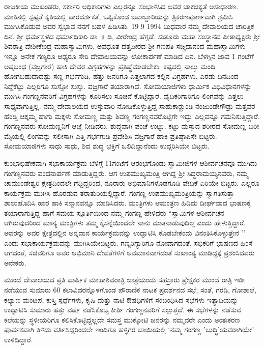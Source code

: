 {ರಾಜಕೀಯ  ಮುಖಂಡರು,  ಸರ್ಕಾರಿ ಅಧಿಕಾರಿಗಳು ಎಲ್ಲರನ್ನೂ ಸಂಭಾಳಿಸಿದ ಅವರ ಚಾಕಚಕ್ಯತೆ ಅಸಾಧಾರಣ. ಮಾತಿನಲ್ಲಿ ಸ್ಪಷ್ಟತೆ ಕೃತಿಯಲ್ಲಿ ಪಾರದರ್ಶಕತೆ, ಒಪ್ಪಿಕೊಂಡ ಜವಾಬ್ದಾರಿಯನ್ನು ತ್ರಿಕರಣಪೂರ್ಣವಾಗಿ ಶ್ರಮಿಸಿ ಮುಗಿಸಿಕೊಡುವ ಅವರ ಸ್ವಭಾವ ನನಗೆ ಬಹಳ ಹಿಡಿಸಿತು. 19  \enginline{-}  9  \enginline{-}  1994 ಬುಧವಾರ ನಮ್ಮ ದೇವಾಲಯದ ಚಾರಿತ್ರಿಕ ದಿನ. ಶ್ರೀ ಧರ್ಮಸ್ಥಳದ ಧರ್ಮಾಧಿಕಾರಿ ಡಾ~॥ ಡಿ, ವೀರೇಂದ್ರ ಹೆಗ್ಗಡೆ, ಸುತ್ತೂರು ಮಹಾ ಸಂಸ್ಥಾನದ ಪೀಠಾಧ್ಯಕ್ಷರು ಶ್ರೀ ಶಿವರಾತ್ರಿ ದೇಶೀಕೇಂದ್ರ ಮಹಾಸ್ವಾಮಿಗಳು, ಅವಧೂತ ದತ್ತಪೀಠದ ಶ್ರೀ ಗಣಪತಿ ಸಚ್ಚಿದಾನಂದ ಮಹಾಸ್ವಾಮಿಗಳು ಇನ್ನೂ ಅನೇಕ ಗಣ್ಯರೂ ಆಢ್ಯರೂ ಸೇರಿ ದೇವಾಲಯವನ್ನು ಲೋಕಾರ್ಪಣೆ ಮಾಡಿದ ದಿನ. ಬೆಳಗ್ಗಿನ ಜಾವ 1 ಗಂಟೆಗೆ ಅಷ್ಠಬಂಧ (ವಜ್ರಗಾರೆ) ಹಾಕಿ ದೇವರ ವಿಗ್ರಹಗಳನ್ನು ಪ್ರತಿಷ್ಥೆಮಾಡಬೇಕು. ಕಷ್ಟದಲ್ಲಿ ನಾಲ್ಕು ಮಂದಿ ಹೋಗಬಹುದಾದಷ್ಟು ಸಣ್ಣ ಗರ್ಭಗುಡಿ, ಹತ್ತು ಜನರಿಗೂ ಎತ್ತಲಾಗದ ಕಲ್ಲಿನ ವಿಗ್ರಹಗಳು, ಎರಡು ದಿನದಿಂದ ನಿದ್ದೆಕೆಟ್ಟು ಎಲ್ಲರಿಗೂ ಸುಸ್ತೋ ಸುಸ್ತು. ವಜ್ರಗಾರೆ ತಯಾರಾಗಿದೆ. ಸೋಮಯಾಜಿಗಳು ಧಾರ್ಮಿಕ ವಿಧಿವಿಧಾನಗಳನ್ನು ಮುಗಿಸಿ ಗಂಗಣ್ಣನವರಿಗೆ ವಿಗ್ರಹಗಳನ್ನು ಕೂರಿಸಲು ಸೂಚನೆ ಕೊಟ್ಟಿದ್ದಾರೆ. ವೈದಿಕರಿಗಾರಿಗೂ ಲಿಂಗವನ್ನು ಎತ್ತಲು ಸಾಧ್ಯವಾಗುತ್ತಿಲ್ಲ. ನಮ್ಮ ದೇವಾಲಯದ ಉಸ್ತುವಾರಿ ನೋಡಿಕೊಳ್ಳುತ್ತಿದ್ದ ಸಾಹುಕಾರ್‍ಹುಂಡಿ ನಂಜುಂಡೇಗೌಡ್ರು ಮತ್ತವರ ಹೆಂಡ್ತಿ ಚಿಕ್ಕಮ್ಮ ಹಾಗು ಮಕ್ಕಳು ಸೋಮಣ್ಣ ಮತ್ತು ಶಿವಣ್ಣ ಗಂಗಣ್ಣನವರೊಟ್ಟಿಗೇ ಇದ್ದು ಎಲ್ಲವನ್ನೂ ಗಮನಿಸುತ್ತಿದ್ದಾರೆ. ಗಂಗಣ್ಣನವರು ಸೋಮಣ್ಣನಿಗೆ ಆಜ್ಞೆ ನೀಡಿದರು. ಶುದ್ಧವಾಗಿ ಪಂಚೆ ಉಟ್ಟು. ಕಟ್ಟು ಮಸ್ತಾದ ಶರೀರದ ಸೋಮಣ್ಣ ಬರೀ ಮೈಯಲ್ಲಿ ಲಿಂಗವನ್ನು ಸಲೀಸಾಗಿ ಎತ್ತಿ ಗರ್ಭಗುಡಿ ಪ್ರವೇಶಿಸಿ ವಜ್ರಗಾರೆ ಹಾಕಿ ಪ್ರತಿಷ್ಠಾಪಿಸೇ ಬಿಟ್ಟರು. ಸೋಮಯಾಜಿಗಳು ಸಾಧು ಸಾಧು, ಶಿವ ಶುದ್ಧ ಭಕ್ತಿಗೆ ಒಲಿದಿದ್ದಾನೆಂದು ಉದ್ಗರಿಸಿಯೇ ಬಿಟ್ಟರು.

ಕುಂಭಾಭಿಷೇಕವಾಗಿ ಸಭಾಕಾರ್ಯಕ್ರಮ ಬೆಳಿಗ್ಗೆ 11ಗಂಟೆಗೆ ಆರಂಭಗೊಂಡು ಸ್ವಾಮೀಜಿಗಳ ಆಶೀರ್ವಚನವೂ ಮುಗಿದು ಗಂಗಣ್ಣನವರು ವಂದನಾರ್ಪಣೆ ಮಾಡುತ್ತಿದ್ದರು. ಆಗ ಉಪಮುಖ್ಯಮಂತ್ರಿ ಆಗಿದ್ದ ಶ್ರೀ ಸಿದ್ಧರಾಮಯ್ಯನವರು, ನಮ್ಮ ಚಾಮುಂಡೇಶ್ವರಿ ಕ್ಷೇತ್ರದಿಂದಲೇ ಗೆದ್ದಿದ್ದರಿಂದ, ನೂರಾರು ಅಭಿಮಾನಿಗಳೊಡಗೂಡಿ ವೇದಿಕೆ ಏರಿಯೇ ಬಿಟ್ಟರು. ಎಲ್ಲರೂ ಕಾರ್ಯಕ್ರಮ ಮುಗಿಸಿ ಹೊರಡುವ ತರಾತುರಿಯಲ್ಲಿದ್ದಾರೆ. ಗಂಗಣ್ಣ ಉಪಮುಖ್ಯಮಂತ್ರಿಯನ್ನು ಸ್ವಾಗತಿಸುತ್ತಾ ಶಾಲುಹೊದಿಸಿ ಹಾರ ಹಾಕಿ ಸನ್ಮಾನವನ್ನೂ ಮಾಡಿಸಿದರು. ಮಂತ್ರಿಗಳು ಆಮಂತ್ರಣ ಹಿಡಿದು ದೀರ್ಘವಾದ ಭಾಷಣಕ್ಕೆ ತಯಾರಾಗುತ್ತಿದ್ದ ಹಾಗೆ ಸಮಯ ಸ್ಪೂರ್ತಿಯಿಂದ ನಮ್ಮ ಗಂಗಣ್ಣ ಹೇಳಿದರು  \enginline{-}   “ಸ್ವಾಮಿಗಳ ಆಶೀರ್ವಚನ ಆಗಿರುವುದರಿಂದ ಮಾನ್ಯ ಮಂತ್ರಿಗಳು ತಮ್ಮ ಕೈಸನ್ನೆಯಿಂದಲೇ ನಾನು ಮಾತನಾಡುವುದಿಲ್ಲ ಎಂದು ಹೇಳುತ್ತಿದ್ದಾರೆ. ಅವರನ್ನು ಅವರ ಕ್ಷೇತ್ರದಲ್ಲಿನ ಅನ್ನದಾನ ಕಾರ್ಯಕ್ರಮವನ್ನು ಉದ್ಘಾಟಿಸಿ ಕೊಡಬೇಕೆಂದು ವಿನಂತಿಸಿಕೊಳ್ಳುತ್ತೇನೆ ’’ ಎಂದು ಸಭಾಕಾರ್ಯಕ್ರಮವನ್ನು ಮುಗಿಸಿಯೇಬಿಟ್ಟರು. ಗಣ್ಯರಿಗ್ಯಾರಿಗೂ ನೋವಾಗದಂತೆ, ಸಭಿಕರಿಗೆ ಭಾಷಣದ ಹಿಂಸೆ ಆಗದಂತೆ, ಸಚಿವರಿಗೂ ಅವರ ಆಭಿಮಾನಿ ದೇವತೆಗಳಿಗೆ ಅವಮಾನವಾಗದಂತೆ ಸುಖಾಂತ್ಯ ಮಾಡಿದ್ದಕ್ಕೆ ಪ್ರಶಂಸಿದವರು ಅನೇಕರು.

ಮುಂದೆ ದೇವಾಲಯದ ಪ್ರತಿ ವಾರ್ಷಿಕ ಮಾಹಾಶಿವರಾತ್ರಿ ಜಾತ್ರೆಯಂದು ಸಹಸ್ರಾರು ಪ್ರೇಕ್ಷಕರ ಮುಂದೆ ರಾತ್ರಿ ಇಡೀ ನಡೆಯುವ ಸುಮಾರು 60 ಕಲಾವಿದರನ್ನೊಳಗೊಂಡ ಪೌರಾಣಿಕ ನಾಟಕ ಪ್ರದರ್ಶನದ ಸಭೆ;  ಸಂತೆ, ಗರಡಿ, ಗೋಶಾಲೆ, ಕಲ್ಯಾಣ ಮಂಟಪ, ಕುಸ್ತಿ ಸ್ಪರ್ಧೆಗಳು, ಕೃಷಿ ಮತ್ತು ನಾಟಿ ಔಷಧಿಗಳಿಗೆ ಸಂಬಂಧಿಸಿದ ಸಭೆಗಳು ಇತ್ಯಾದಿಯನ್ನು ಉದ್ಘಾಟಿಸಿ ಸುಮಾರು ಹತ್ತು ವರ್ಷ ನಡೆಸಿಕೊಟ್ಟ ಕೀರ್ತಿ ಗಂಗಣ್ಣನವರಿಗೆ ಸಲ್ಲುತ್ತದೆ. ಈ ಸಭೆಗಳನ್ನು ನಡೆಸುವ ಕಲೆಯನ್ನು ಸ್ಥಳೀಯರಿಗೂ ಕಲಿಸಿಕೊಟ್ಟಿದ್ದಲ್ಲದೇ ಸಮಸ್ತ ಮುಕ್ಕೋಟಿ ಜನರನ್ನು ನಮ್ಮವರೇ ಎಂದು ಅಂತಃಕರಣ ಪೂರ್ವಕವಾಗಿ ತಿಳಿದು ವರ್ತಿಸಿದ್ದರಿಂದಲೇ ಇಂದಿಗೂ ಹಳ್ಳಿಗರ ಬಾಯಿಯಲ್ಲಿ `ನಮ್ಮ ಗಂಗಣ್ಣ ’ಬುದ್ಧಿ’ಯವರಾಗಿಯೇ’ ಉಳಿದಿದ್ದಾರೆ.

}

